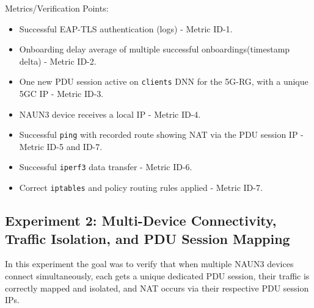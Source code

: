 Metrics/Verification Points:
\begin{itemize}
    \item Successful \ac{EAP-TLS} authentication (logs) - Metric ID-1.
    \item Onboarding delay average of multiple successful onboardings(timestamp delta) - Metric ID-2.
    \item One new \ac{PDU} session active on \texttt{clients} \ac{DNN} for the \ac{5G-RG}, with a unique \ac{5GC} \ac{IP} - Metric ID-3.
    \item \ac{NAUN3} device receives a local \ac{IP} - Metric ID-4.
    \item Successful \texttt{ping} with recorded route showing \ac{NAT} via the \ac{PDU} session \ac{IP} - Metric ID-5 and ID-7.
    \item Successful \texttt{iperf3} data transfer - Metric ID-6.
    \item Correct \texttt{iptables} and policy routing rules applied - Metric ID-7.
\end{itemize}

\subsection{Experiment 2: Multi-Device Connectivity, Traffic Isolation, and \acs{PDU} Session Mapping}

In this experiment the goal was to verify that when multiple \ac{NAUN3} devices connect simultaneously, each gets a unique dedicated \ac{PDU} session, their traffic is correctly mapped and isolated, and \ac{NAT} occurs via their respective \ac{PDU} session \acp{IP}.

